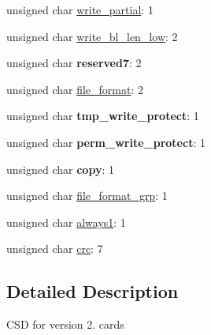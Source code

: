 \begin{DoxyCompactItemize}
\item 
unsigned char \hyperlink{struct_c_s_d_v2_a062890f25943538976760e7db822a635}{write\-\_\-partial}\-: 1
\item 
unsigned char \hyperlink{struct_c_s_d_v2_ad61c0325b9602bdb15cf59b69fc4a67f}{write\-\_\-bl\-\_\-len\-\_\-low}\-: 2
\item 
\hypertarget{struct_c_s_d_v2_a88028b6a6993ea4c35717196f8e16a9e}{unsigned char {\bfseries reserved7}\-: 2}\label{struct_c_s_d_v2_a88028b6a6993ea4c35717196f8e16a9e}

\item 
unsigned char \hyperlink{struct_c_s_d_v2_aa1a7dd102774cf915cbe66010250253d}{file\-\_\-format}\-: 2
\item 
\hypertarget{struct_c_s_d_v2_a0d4a26aaf05de47ca630a0976e897f90}{unsigned char {\bfseries tmp\-\_\-write\-\_\-protect}\-: 1}\label{struct_c_s_d_v2_a0d4a26aaf05de47ca630a0976e897f90}

\item 
\hypertarget{struct_c_s_d_v2_a674d846d31b5a170bf7b2a27d8c8856a}{unsigned char {\bfseries perm\-\_\-write\-\_\-protect}\-: 1}\label{struct_c_s_d_v2_a674d846d31b5a170bf7b2a27d8c8856a}

\item 
\hypertarget{struct_c_s_d_v2_a0ff3051eb9cb79426196331363674fa7}{unsigned char {\bfseries copy}\-: 1}\label{struct_c_s_d_v2_a0ff3051eb9cb79426196331363674fa7}

\item 
unsigned char \hyperlink{struct_c_s_d_v2_aa44f7b6ef5fd710a716fa9ef045c68f0}{file\-\_\-format\-\_\-grp}\-: 1
\item 
unsigned char \hyperlink{struct_c_s_d_v2_af3bbe76c61e108c500f5a861dff1e6c2}{always1}\-: 1
\item 
unsigned char \hyperlink{struct_c_s_d_v2_aa7963a1d695d609cf3609747cf19fd71}{crc}\-: 7
\end{DoxyCompactItemize}


\subsection{Detailed Description}
C\-S\-D for version 2. cards 

